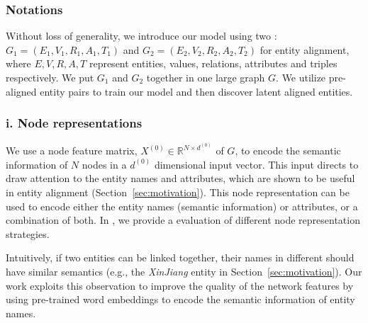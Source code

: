\subsubsection{Notations}

Without loss of generality, we introduce our model using two \KGs: $G_1 = (E_1,V_1,R_1,A_1,T_1)$ and $G_2 = (E_2,V_2,R_2,A_2,T_2)$ for
entity alignment, where $E,V,R,A,T$ represent entities, values, relations, attributes and triples respectively. 	We put $G_1$ and $G_2$
together in one large graph $G$. We utilize pre-aligned entity pairs to train our model and then discover latent aligned entities.

%



\subsubsection{i. Node representations}
	\label{subsection:Node Representations}
   We use a node feature matrix, $X^{(0)} \in \mathbb{R}^{N \times d^{(0)}}$ of $G$, to encode the semantic information of $N$  nodes in a
   $d^{(0)}$ dimensional input vector. This input directs \RGCN to draw attention to the entity names and attributes, which are shown to be
   useful in entity alignment (Section~\ref{sec:motivation}). This node representation can be used to encode either the entity names
   (semantic information) or attributes, or a combination of both. In , we provide a evaluation of different node
   representation strategies.


	
	\label{wordvector}
	Intuitively, if two entities can be linked together, their names in different \KGs should have similar semantics (e.g., the \emph{XinJiang} entity in Section~\ref{sec:motivation}).
    Our work exploits this observation to improve the quality of the network features by using pre-trained word embeddings to encode the semantic
    information of entity names.

